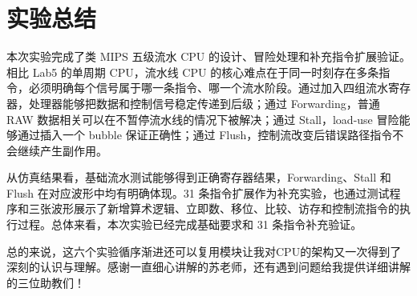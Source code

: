 \documentclass[UTF8,zihao=-4]{ctexart}
\begin{document}
\section{实验总结}

本次实验完成了类 MIPS 五级流水 CPU 的设计、冒险处理和补充指令扩展验证。相比 Lab5 的单周期 CPU，流水线 CPU 的核心难点在于同一时刻存在多条指令，必须明确每个信号属于哪一条指令、哪一个流水阶段。通过加入四组流水寄存器，处理器能够把数据和控制信号稳定传递到后级；通过 Forwarding，普通 RAW 数据相关可以在不暂停流水线的情况下被解决；通过 Stall，load-use 冒险能够通过插入一个 bubble 保证正确性；通过 Flush，控制流改变后错误路径指令不会继续产生副作用。

从仿真结果看，基础流水测试能够得到正确寄存器结果，Forwarding、Stall 和 Flush 在对应波形中均有明确体现。31 条指令扩展作为补充实验，也通过测试程序和三张波形展示了新增算术逻辑、立即数、移位、比较、访存和控制流指令的执行过程。总体来看，本次实验已经完成基础要求和 31 条指令补充验证。

总的来说，这六个实验循序渐进还可以复用模块让我对CPU的架构又一次得到了深刻的认识与理解。感谢一直细心讲解的苏老师，还有遇到问题给我提供详细讲解的三位助教们！
\end{document}
